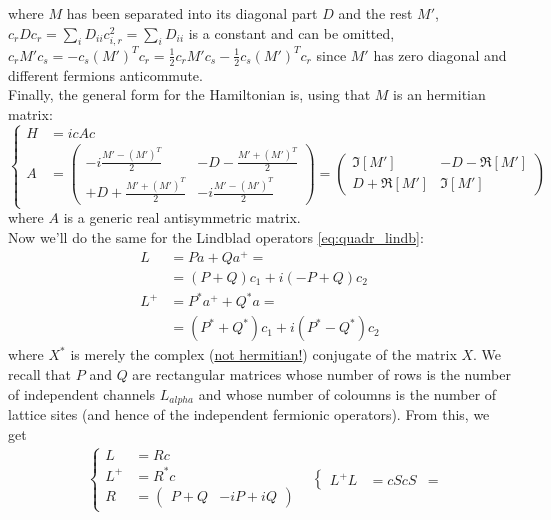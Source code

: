 \documentclass[a4paper,11pt]{article}
\newcommand{\nl}{\vskip 0.3cm}
\newcommand{\ubar}[1]{\underline{#1}}
\begin{document}
   where $M$ has been separated into its diagonal part $D$ and the rest $\displaystyle M'$, $c_rDc_r = \sum_iD_{ii}c_{i,r}^2 = \sum_i D_{ii}$ is a constant and can be omitted, $\displaystyle c_rM'c_s = - c_s(M')^Tc_r = \frac{1}{2}c_rM'c_s - \frac{1}{2}c_s(M')^Tc_r$ since $M'$ has zero diagonal and different fermions anticommute.\\ Finally, the general form for the Hamiltonian is, using that $M$ is an hermitian matrix:
    \begin{equation}
    \label{eq:quadr_ham_majorana}
     \begin{cases}
     H &= icAc\\
     A &= \left(
     \begin{array}{cc}
       -i\frac{M'-(M')^T}{2} & -D - \frac{M'+(M')^T}{2} \\
       + D + \frac{M'+(M')^T}{2} & -i \frac{M'-(M')^T}{2}
        \end{array}
        \right)
      =\left( 
      \begin{array}{cc}
        \Im[M'] & -D-\Re[M']\\
        D+\Re[M'] & \Im[M']
        \end{array}
        \right)
      \end{cases}
     \end{equation}
where $A$ is a generic real antisymmetric matrix.\\ \nl Now we'll do the same for the Lindblad operators \ref{eq:quadr_lindb}:
\begin{align*}
 L &= P a + Q a^+=\\
   &= (P+Q)c_1 +i(-P+Q)c_2\\
 L^+&= P^*a^++Q^*a=\\
   &= (P^*+Q^*)c_1+i(P^*-Q^*)c_2  
\end{align*} 
where $X^*$ is merely the complex (\ubar{not hermitian!}) conjugate of the matrix $X$. We recall that $P$ and $Q$ are rectangular matrices whose number of rows is the number of independent channels $L_{alpha}$ and whose number of coloumns is the number of lattice sites (and hence of the independent fermionic operators). From this, we get
\begin{subequations}
 \label{eq:quadr_lindb_majorana}
\begin{align}
 & \begin{cases}
    L & = Rc\\
    L^+& = R^*c\\
    R &= \left(\begin{array}{cc} P+Q & -iP+iQ\end{array}\right)
    \end{cases}
 & \begin{cases}
    L^+L & = cSc
    S &  = 
   \end{cases}
  
\end{align}
\end{subequations}
 
\end{document}
